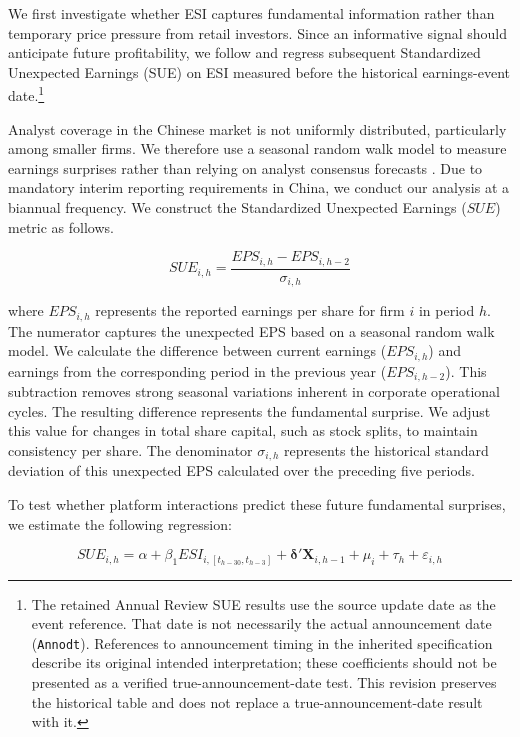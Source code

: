 \documentclass[12pt]{article}
\begin{document}
We first investigate whether ESI captures fundamental information rather than temporary price pressure from retail investors. Since an informative signal should anticipate future profitability, we follow \citet{chen2014} and regress subsequent Standardized Unexpected Earnings (SUE) on ESI measured before the historical earnings-event date.\footnote{The retained Annual Review SUE results use the source update date as the event reference. That date is not necessarily the actual announcement date (\texttt{Annodt}). References to announcement timing in the inherited specification describe its original intended interpretation; these coefficients should not be presented as a verified true-announcement-date test. This revision preserves the historical table and does not replace a true-announcement-date result with it.}

Analyst coverage in the Chinese market is not uniformly distributed, particularly among smaller firms. We therefore use a seasonal random walk model to measure earnings surprises rather than relying on analyst consensus forecasts \citep{bernard1989post}. Due to mandatory interim reporting requirements in China, we conduct our analysis at a biannual frequency. We construct the Standardized Unexpected Earnings ($SUE$) metric as follows.

\begin{equation}
    SUE_{i,h} = \frac{EPS_{i,h} - EPS_{i,h-2}}{\sigma_{i,h}}
\end{equation}

\noindent where $EPS_{i,h}$ represents the reported earnings per share for firm $i$ in period $h$. The numerator captures the unexpected EPS based on a seasonal random walk model. We calculate the difference between current earnings ($EPS_{i,h}$) and earnings from the corresponding period in the previous year ($EPS_{i,h-2}$). This subtraction removes strong seasonal variations inherent in corporate operational cycles. The resulting difference represents the fundamental surprise. We adjust this value for changes in total share capital, such as stock splits, to maintain consistency per share. The denominator $\sigma_{i,h}$ represents the historical standard deviation of this unexpected EPS calculated over the preceding five periods.

To test whether platform interactions predict these future fundamental surprises, we estimate the following regression:

\begin{equation}
    SUE_{i, h} = \alpha + \beta_1 ESI_{i,[t_{h-30}, t_{h-3}]} + \boldsymbol{\delta}'\mathbf{X}_{i,h-1} + \mu_i + \tau_h + \varepsilon_{i,h}
\end{equation}
\end{document}
